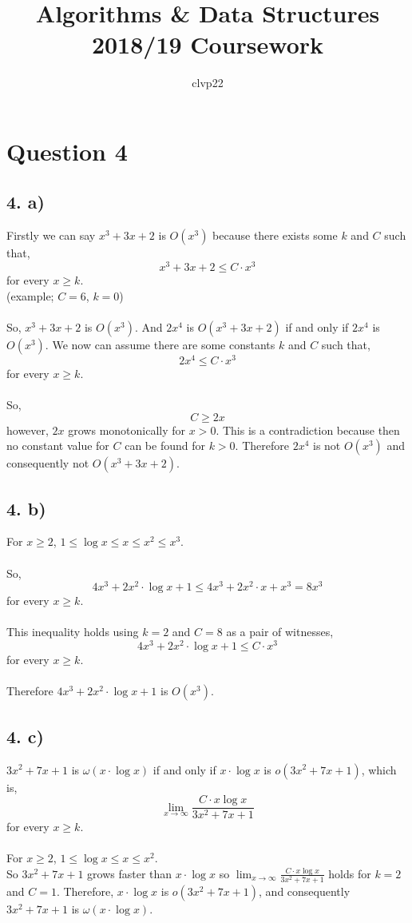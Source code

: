 \documentclass[]{article}
\title{Algorithms \& Data Structures 2018/19 Coursework}
\author{clvp22}
\begin{document}
\maketitle

\section{Question 4}
\subsection{4. a)}
Firstly we can say $x^3+3x +2$ is $O(x^3)$ because there exists some $k$ and $C$ such that,
$$x^3+3x+2 \leq C \cdot x^3 $$
for every $x \geq k$.
\\
(example; $C=6$, $k=0$)
\\
\\
So, $x^3+3x +2$ is $O(x^3)$. And $2x^4$ is $O(x^3+3x +2)$ if and only if $2x^4$ is $O(x^3)$. We now can assume there are some constants $k$ and $C$ such that,
$$2x^4 \leq C \cdot x^3$$
for every $x \geq k$.
\\
\\
So,
$$ C \geq 2x$$
however, $2x$ grows monotonically for $x > 0$. This is a contradiction because then no constant value for $C$ can be found for $k>0$. Therefore $2x^4$ is not $O(x^3)$ and consequently not $O(x^3+3x +2)$.
\subsection{4. b)}
For $x \geq 2$, $1 \leq \log x \leq x \leq x^2 \leq x^3$.
\\
\\
So,
$$4x^3+2x^2 \cdot \log x +1 \leq 4x^3+2x^2 \cdot x + x^3 = 8x^3$$
for every $x \geq k$.
\\
\\
This inequality holds using $k=2$ and $C=8$ as a pair of witnesses,
$$4x^3 +2x^2 \cdot \log x +1 \leq C \cdot x^3 $$
for every $x \geq k$.
\\
\\
Therefore $4x^3+2x^2 \cdot \log x +1$ is $O(x^3)$.
\subsection{4. c)}
$3x^2+7x+1$ is $\omega (x \cdot \log x)$ if and only if $x \cdot \log x$ is $o(3x^2+7x+1)$, which is,
$$\displaystyle{\lim_{x \to \infty}} \frac{C \cdot x \log x}{3x^2+7x+1}$$
for every $x \geq k$.
\\
\\
For $x \geq 2$, $1 \leq \log x \leq x \leq x^2$. 
\\
So $3x^2+7x+1$ grows faster than $x \cdot \log x$ so $\displaystyle{\lim_{x \to \infty}} \frac{C \cdot x \log x}{3x^2+7x+1}$ holds for $k = 2$ and $C=1$. Therefore, $x \cdot \log x$ is $o(3x^2+7x+1)$, and consequently $3x^2+7x+1$ is $\omega (x \cdot \log x)$.
\end{document}
